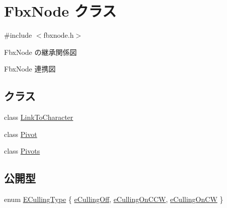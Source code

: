 \hypertarget{class_fbx_node}{}\section{Fbx\+Node クラス}
\label{class_fbx_node}


{\ttfamily \#include $<$fbxnode.\+h$>$}



Fbx\+Node の継承関係図


Fbx\+Node 連携図
\subsection*{クラス}
\begin{DoxyCompactItemize}
\item 
class \hyperlink{class_fbx_node_1_1_link_to_character}{Link\+To\+Character}
\item 
class \hyperlink{class_fbx_node_1_1_pivot}{Pivot}
\item 
class \hyperlink{class_fbx_node_1_1_pivots}{Pivots}
\end{DoxyCompactItemize}
\subsection*{公開型}
\begin{DoxyCompactItemize}
\item 
enum \hyperlink{class_fbx_node_afdb6d2c1708802d8b175f5094ff06046}{E\+Culling\+Type} \{ \hyperlink{class_fbx_node_afdb6d2c1708802d8b175f5094ff06046ad1b15be3d6e4389cae55274dd6c9252c}{e\+Culling\+Off}, 
\hyperlink{class_fbx_node_afdb6d2c1708802d8b175f5094ff06046ad305d6e9b21ce08664513b6a7a1dc1c6}{e\+Culling\+On\+C\+CW}, 
\hyperlink{class_fbx_node_afdb6d2c1708802d8b175f5094ff06046a2642748f83675b7421e4488f13cc5af7}{e\+Culling\+On\+CW}
 \}
\end{DoxyCompactItemize}
